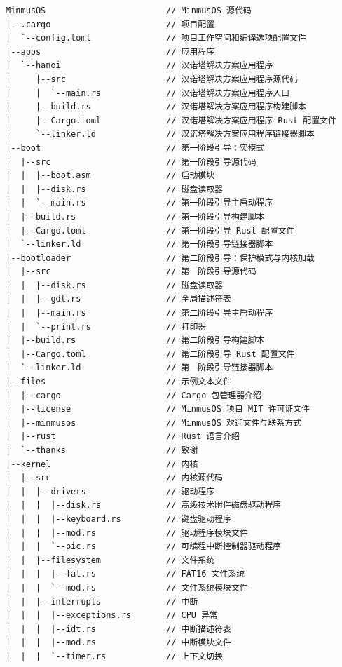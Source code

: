 \begin{verbatim}
MinmusOS                        // MinmusOS 源代码
|--.cargo                       // 项目配置
|  `--config.toml               // 项目工作空间和编译选项配置文件
|--apps                         // 应用程序
|  `--hanoi                     // 汉诺塔解决方案应用程序
|     |--src                    // 汉诺塔解决方案应用程序源代码
|     |  `--main.rs             // 汉诺塔解决方案应用程序入口
|     |--build.rs               // 汉诺塔解决方案应用程序构建脚本
|     |--Cargo.toml             // 汉诺塔解决方案应用程序 Rust 配置文件
|     `--linker.ld              // 汉诺塔解决方案应用程序链接器脚本
|--boot                         // 第一阶段引导：实模式
|  |--src                       // 第一阶段引导源代码
|  |  |--boot.asm               // 启动模块
|  |  |--disk.rs                // 磁盘读取器
|  |  `--main.rs                // 第一阶段引导主启动程序
|  |--build.rs                  // 第一阶段引导构建脚本
|  |--Cargo.toml                // 第一阶段引导 Rust 配置文件
|  `--linker.ld                 // 第一阶段引导链接器脚本
|--bootloader                   // 第二阶段引导：保护模式与内核加载
|  |--src                       // 第二阶段引导源代码
|  |  |--disk.rs                // 磁盘读取器
|  |  |--gdt.rs                 // 全局描述符表
|  |  |--main.rs                // 第二阶段引导主启动程序
|  |  `--print.rs               // 打印器
|  |--build.rs                  // 第二阶段引导构建脚本
|  |--Cargo.toml                // 第二阶段引导 Rust 配置文件
|  `--linker.ld                 // 第二阶段引导链接器脚本
|--files                        // 示例文本文件
|  |--cargo                     // Cargo 包管理器介绍
|  |--license                   // MinmusOS 项目 MIT 许可证文件
|  |--minmusos                  // MinmusOS 欢迎文件与联系方式
|  |--rust                      // Rust 语言介绍
|  `--thanks                    // 致谢
|--kernel                       // 内核
|  |--src                       // 内核源代码
|  |  |--drivers                // 驱动程序
|  |  |  |--disk.rs             // 高级技术附件磁盘驱动程序
|  |  |  |--keyboard.rs         // 键盘驱动程序
|  |  |  |--mod.rs              // 驱动程序模块文件
|  |  |  `--pic.rs              // 可编程中断控制器驱动程序
|  |  |--filesystem             // 文件系统
|  |  |  |--fat.rs              // FAT16 文件系统
|  |  |  `--mod.rs              // 文件系统模块文件
|  |  |--interrupts             // 中断
|  |  |  |--exceptions.rs       // CPU 异常
|  |  |  |--idt.rs              // 中断描述符表
|  |  |  |--mod.rs              // 中断模块文件
|  |  |  `--timer.rs            // 上下文切换

\end{verbatim}
